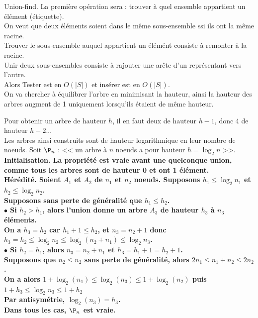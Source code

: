 \documentclass[french, 11pt]{article}
\begin{document}
\begin{defi}{Union-find.}{}
    La première opération sera : trouver à quel ensemble appartient un élément (étiquette).\\
    On veut que deux éléments soient dans le même sous-ensemble ssi ils ont la même racine.\\
    Trouver le sous-ensemble auquel appartient un élémént consiste à remonter à la racine.\\
    Unir deux sous-ensembles consiste à rajouter une arête d'un représentant vers l'autre.\\    
    Alors Tester est en $O(|S|)$ et insérer est en $O(|S|)$.\\
    On va chercher à équilibrer l'arbre en minimisant la hauteur, ainsi la hauteur des arbres augment de 1 uniquement lorsqu'ils étaient de même hauteur.
\end{defi}

\begin{prop}{}{}
    Pour obtenir un arbre de hauteur $h$, il en faut deux de hauteur $h-1$, donc $4$ de hauteur $h-2$...\\
    Les arbres ainsi construits sont de hauteur logarithmique en leur nombre de noeuds.
    \tcblower
    Soit $\P_n$ : << un arbre à $n$ noeuds a pour hauteur $h=\log_2n$ >>.\\
    \bf{Initialisation.} La propriété est vraie avant une quelconque union, comme tous les arbres sont de hauteur 0 et ont 1 élément.\\
    \bf{Hérédité.} Soient $A_1$ et $A_2$ de $n_1$ et $n_2$ noeuds. Supposons $h_1\leq\log_2n_1$ et $h_2\leq\log_2n_2$.\\
    Supposons sans perte de généralité que $h_1\leq h_2$.\\
    $\bullet$ Si $h_2>h_1$, alors l'union donne un arbre $A_3$ de hauteur $h_3$ à $n_3$ éléments.\\
    On a $h_3=h_2$ car $h_1+1\leq h_2$, et $n_3=n_2+1$ donc $h_3=h_2\leq\log_2n_2\leq\log_2(n_2+n_1)\leq\log_2n_3$.\\
    $\bullet$ Si $h_2=h_1$, alors $n_3=n_2+n_1$ et $h_3=h_1+1=h_2+1$.\\
    Supposons que $n_2\leq n_2$ sans perte de généralité, alors $2n_1\leq n_1+n_2 \leq 2n_2$.\\
    On a alors $1+\log_2(n_1)\leq\log_2(n_3)\leq1+\log_2(n_2)$ puis $1+h_3\leq\log_2n_3\leq1+h_2$\\
    Par antisymétrie, $ \log_2(n_3)=h_3$.\\
    Dans tous les cas, $\P_n$ est vraie.
\end{prop}
\end{document}
